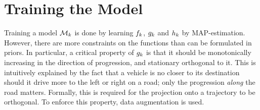 

\section{Training the Model}
Training a model $\mathcal{M}_{k}$ is done by learning
$f_{k}$, $g_{k}$ and $h_{k}$ by MAP-estimation. However, there are
more constraints on the functions than can be formulated in
priors. In particular, a critical property of $g_{k}$
is that it should be monotonically increasing in the direction of progression,
and stationary orthogonal to it. This is intuitively explained by the fact that a
vehicle is no closer to its destination should it drive more to the
left or right on a road; only the progression \textit{along} the road
matters. Formally, this is required for the projection onto a
trajectory to be orthogonal. To enforce this property, data augmentation is used.

